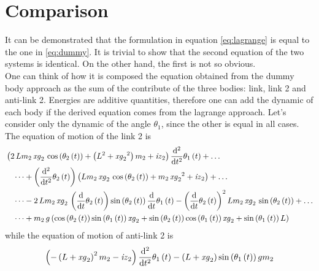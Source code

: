 \section{Comparison}
%
It can be demonstrated that the formulation in equation \ref{eq:lagrange} is equal to the one in \ref{eq:dummy}. It is trivial to show that the second equation of the two systems is identical. On the other hand, the first is not so obvious.\\
One can think of how it is composed the equation obtained from the dummy body approach as the sum of the contribute of the three bodies: link, link 2 and anti-link 2. Energies are additive quantities, therefore one can add the dynamic of each body if the derived equation comes from the lagrange approach. Let's consider only the dynamic of the angle $\theta_1$, since the other is equal in all cases.\\
The equation of motion of the link 2 is 
%
\footnotesize
\begin{equation}
    \label{eq:link2}
\begin{split}
&\left( 2\,Lm_{2}\,{\it xg}_{2}\,\cos \left( \theta_{2} \left( t
\right)  \right) + \left( {L}^{2}+{{\it xg}_{2}}^{2} \right) m_{2}+{
\it iz}_{2} \right) {\frac {{\rm d}^{2}}{{\rm d}{t}^{2}}}\theta_{1}
\left( t \right) + \dots\\
&\quad\dots + \left( {\frac {{\rm d}^{2}}{{\rm d}{t}^{2}}}\theta
_{2} \left( t \right)  \right)  \left( Lm_{2}\,{\it xg}_{2}\,\cos
\left( \theta_{2} \left( t \right)  \right) +m_{2}\,{{\it xg}_{2}}^{2
}+{\it iz}_{2} \right) + \dots \\
& \quad \dots -2\,Lm_{2}\,{\it xg}_{2}\, \left( {\frac 
{\rm d}{{\rm d}t}}\theta_{2} \left( t \right)  \right) \sin \left( 
\theta_{2} \left( t \right)  \right) {\frac {\rm d}{{\rm d}t}}\theta_{
1} \left( t \right) - \left( {\frac {\rm d}{{\rm d}t}}\theta_{2}
\left( t \right)  \right) ^{2}Lm_{2}\,{\it xg}_{2}\,\sin \left( 
\theta_{2} \left( t \right)  \right) + \dots\\
&\quad \dots + m_{2}\,g \left( \cos \left( 
\theta_{2} \left( t \right)  \right) \sin \left( \theta_{1} \left( t
\right)  \right) {\it xg}_{2}+\sin \left( \theta_{2} \left( t
\right)  \right) \cos \left( \theta_{1} \left( t \right)  \right) {
\it xg}_{2}+\sin \left( \theta_{1} \left( t \right)  \right) L
\right)    
\end{split}
\end{equation}
\normalsize
%
while the equation of motion of anti-link 2 is 
%
\footnotesize
\begin{equation}
    \label{eq:antilink2}
    \left( - \left( L+{\it xg}_{2} \right) ^{2}m_{2}-{\it iz}_{2}
    \right) {\frac {{\rm d}^{2}}{{\rm d}{t}^{2}}}\theta_{1} \left( t
    \right) - \left( L+{\it xg}_{2} \right) \sin \left( \theta_{1}
    \left( t \right)  \right) gm_{2}      
\end{equation}
